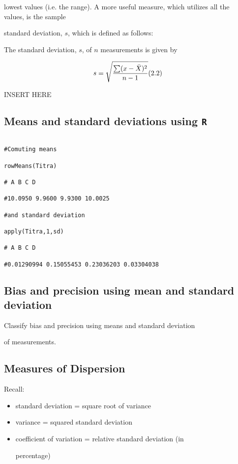 lowest values (i.e. the range). A more useful measure, which utilizes all the values, is the sample

standard deviation, $s$, which is defined as follows:

 

The standard deviation, $s$, of $n$ measurements is given by

\[s=  \sqrt{ {\sum(x-\bar{X})^2 \over n-1} }  (2.2) \]

 



 

INSERT HERE

 

\subsection{Means and standard deviations using \texttt{R}}

\begin{verbatim}

#Comuting means

rowMeans(Titra)

# A B C D

#10.0950 9.9600 9.9300 10.0025

#and standard deviation

apply(Titra,1,sd)

# A B C D

#0.01290994 0.15055453 0.23036203 0.03304038

\end{verbatim}

 

\subsection{Bias and precision using mean and standard deviation}

 

Classify bias and precision using means and standard deviation

of measurements.

 

\subsection{Measures of Dispersion}

Recall:

\begin{itemize}

\item standard deviation  = square root of variance

\item variance = squared standard deviation

\item coefficient of variation = relative standard deviation (in

percentage)

\end{itemize}

